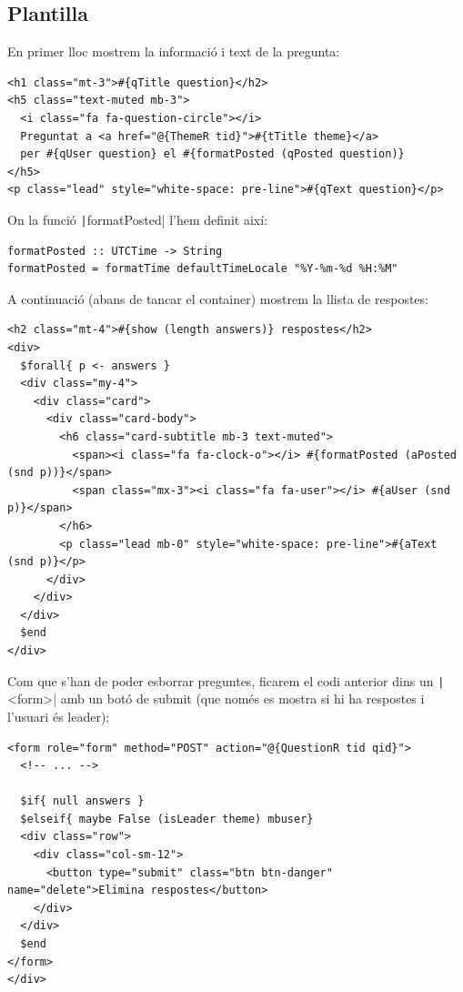 \documentclass[catalan, a4paper]{scrartcl}
\begin{document}

\subsection*{Plantilla}

En primer lloc mostrem la informació i text de la pregunta:

\begin{verbatim}
<h1 class="mt-3">#{qTitle question}</h2>
<h5 class="text-muted mb-3">
  <i class="fa fa-question-circle"></i>
  Preguntat a <a href="@{ThemeR tid}">#{tTitle theme}</a>
  per #{qUser question} el #{formatPosted (qPosted question)}
</h5>
<p class="lead" style="white-space: pre-line">#{qText question}</p>
\end{verbatim}

On la funció \texttt|formatPosted| l'hem definit així:

\begin{verbatim}
formatPosted :: UTCTime -> String
formatPosted = formatTime defaultTimeLocale "%Y-%m-%d %H:%M"
\end{verbatim}

A continuació (abans de tancar el container) mostrem la llista de respostes:

\begin{verbatim}
<h2 class="mt-4">#{show (length answers)} respostes</h2>
<div>
  $forall{ p <- answers }
  <div class="my-4">
    <div class="card">
      <div class="card-body">
        <h6 class="card-subtitle mb-3 text-muted">
          <span><i class="fa fa-clock-o"></i> #{formatPosted (aPosted (snd p))}</span>
          <span class="mx-3"><i class="fa fa-user"></i> #{aUser (snd p)}</span>
        </h6>
        <p class="lead mb-0" style="white-space: pre-line">#{aText (snd p)}</p>
      </div>
    </div>
  </div>
  $end
</div>
\end{verbatim}

Com que s'han de poder esborrar preguntes, ficarem
el codi anterior dins un \texttt|<form>| amb un botó
de submit (que només es mostra si hi ha respostes i l'usuari és leader):

\begin{verbatim}
<form role="form" method="POST" action="@{QuestionR tid qid}">
  <!-- ... -->

  $if{ null answers }
  $elseif{ maybe False (isLeader theme) mbuser}
  <div class="row">
    <div class="col-sm-12">
      <button type="submit" class="btn btn-danger" name="delete">Elimina respostes</button>
    </div>
  </div>
  $end
</form>
</div>
\end{verbatim}
\end{document}
